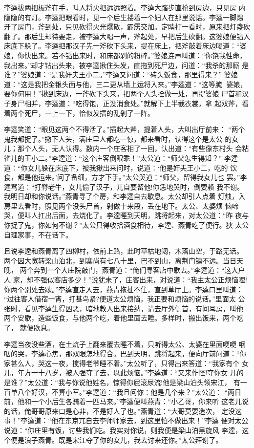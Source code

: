 李逵拔两把板斧在手，叫人将火把远远照着。李逵大踏步直抢到房边，只见房
内隐隐的有灯。李逵把眼看时，见一个后生搂着一个妇人在那里说话。李逵一脚踢
开了房门，斧到处，只见砍得火光爆散，霹雳交加。定睛打一看时，原来把灯盏砍
翻了。那后生却待要走，被李逵大喝一声，斧起处，早把后生砍翻。这婆娘便钻入
床底下躲了。李逵把那汉子先一斧砍下头来，提在床上，把斧敲着床边喝道：“婆
娘，你快出来。若不钻出来时，和床都剁的粉碎。”婆娘连声叫道：“你饶我性命，
我出来。”却才钻出头来，被李逵揪住头发，直拖到死尸边，问道：“我杀的那厮
是谁？”婆娘道：“是我奸夫王小二。”李逵又问道：“砖头饭食，那里得来？”
婆娘道：“这是我把金银头面与他，三二更从墙上运将入来。”李逵道：“这等腌
婆娘，要你何用！”揪到床边，一斧砍下头来，把两个人头拴做一处，再提婆娘
尸首和汉子身尸相并，李逵道：“吃得饱，正没消食处。”就解下上半截衣裳，拿
起双斧，看着两个死尸，一上一下，恰似发擂的乱剁了一阵。

李逵笑道：“眼见这两个不得活了。”插起大斧，提着人头，大叫出厅前来：
“两个鬼我都捉了。”撇下人头，满庄里人都吃一惊，都来看时，认得这个是太公
的女儿；那个人头，无人认得。数内一个庄客相了一回，认出道：“有些像东村头
会粘雀儿的王小二。”李逵道：“这个庄客倒眼乖！”太公道：“师父怎生得知？”
李逵道：“你女儿躲在床底下，被我揪出来问时，说道：‘他是奸夫王小二，吃的
饮食，都是他运来。’问了备细，方才下手。”太公哭道：“师父，留得我女儿也
罢。”李逵骂道：“打脊老牛，女儿偷了汉子，兀自要留他!你恁地哭时，倒要赖
我不谢。我明日却和你说话。”燕青寻了个房，和李逵自去歇息。太公却引人点着
灯烛，入房里去看时，照见两个没头尸首，剁做十来段，丢在地下。太公、太婆烦
恼啼哭，便叫人扛出后面，去烧化了。李逵睡到天明，跳将起来，对太公道：“昨
夜与你捉了鬼，你如何不谢？”太公只得收拾酒食相待，李逵、燕青吃了便行。狄
太公自理家事，不在话下。

且说李逵和燕青离了四柳村，依前上路，此时草枯地阔，木落山空，于路无话。
两个因大宽转梁山泊北，到寨尚有七八十里，巴不到山，离荆门镇不远。当日天晚，
两个奔到一个大庄院敲门，燕青道：“俺们寻客店中歇去。”李逵道：“这大户人
家，却不强似客店多少！”说犹未了，庄客出来，对说道：“我主太公正烦恼哩!
你两个别处去歇。”李逵直走入去，燕青拖扯不住，直到草厅上。李逵口里叫道：
“过往客人借宿一宵，打甚鸟紧?便道太公烦恼，我正要和烦恼的说话。”里面太
公张时，看见李逵生得凶恶，暗地教人出来接纳，请去厅外侧首，有间耳房，叫他
两个安歇，造些饭食，与他两个吃，着他里面去睡。多样时，搬出饭来，两个吃了，
就便歇息。

李逵当夜没些酒，在土炕子上翻来覆去睡不着，只听得太公、太婆在里面哽哽
咽咽的哭，李逵心焦，那双眼怎地得合。巴到天明，跳将起来，便向厅前问道：“你
家甚么人，哭这一夜，搅得老爷睡不着。”太公听了，只得出来答道：“我家有个
女儿，年方一十八岁，被人强夺了去，以此烦恼。”李逵道：“又来作怪!夺你女
儿的是谁？”太公道：“我与你说他姓名，惊得你屁滚尿流!他是梁山泊头领宋江，
有一百单八个好汉，不算小军。”李逵道：“我且问你：他是几个来？”太公道：
“两日前，他和一个小后生各骑着一匹马来。”李逵便叫燕青：“小乙哥，你来听
这老儿说的话，俺哥哥原来口是心非，不是好人了也。”燕青道：“大哥莫要造次，
定没这事！”李逵道：“他在东京兀自去李师师家去，到这里怕不做出来！”李逵
便对太公说道：“你庄里有饭，讨些我们吃。我实对你说，则我便是梁山泊黑旋风
李逵，这个便是浪子燕青。既是宋江夺了你的女儿，我去讨来还你。”太公拜谢了。

